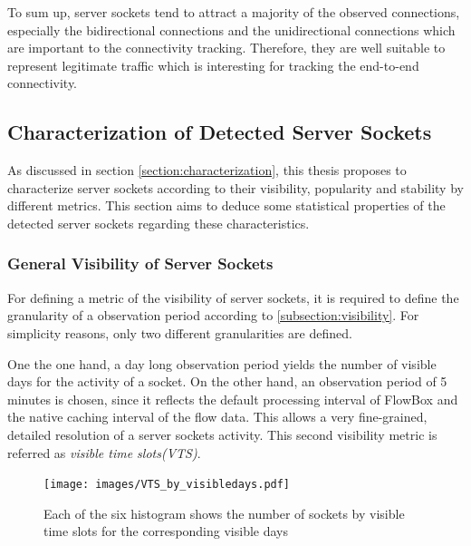 To sum up, \glspl{server socket} tend to attract a majority of the observed connections, especially the bidirectional connections and the unidirectional connections which are important to the connectivity tracking. 
Therefore, they are well suitable to represent legitimate traffic which is interesting for tracking the end-to-end connectivity.


\newpage
\subsection{Characterization of Detected Server Sockets}

As discussed in section \ref{section:characterization}, this thesis proposes to characterize \glspl{server socket} according to their visibility, popularity and stability by different metrics. This section aims to deduce some statistical properties of the detected \glspl{server socket} regarding these characteristics.

\subsubsection{General Visibility of Server Sockets}

For defining a metric of the visibility of \glspl{server socket}, it is required to define the granularity of a observation period according to \ref{subsection:visibility}. For simplicity reasons, only two different granularities are defined.

One the one hand, a day long observation period yields the number of visible days for the activity of a socket. 
On the other hand, an observation period of 5 minutes is chosen, since it reflects the default processing interval of FlowBox and the native caching interval of the flow data.
This allows a very fine-grained, detailed resolution of a \glspl{server socket} activity. 
This second visibility metric is referred as \emph{visible time slots(VTS)}.

\begin{figure}
	[hb] \centering
	\texttt{[image: images/VTS\_by\_visibledays.pdf]}
	\caption{Each of the six histogram shows the number of sockets by visible time slots for the corresponding visible days}
	\label{fig:vts_by_visibledays}
\end{figure}

